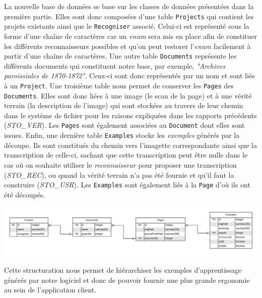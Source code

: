 La nouvelle base de données se base sur les classes de données présentées dans la première partie. Elles sont donc composées d'une table \texttt{Projects} qui contient les projets existants ainsi que le \texttt{Recogniser} associé. Celui-ci est représenté sous la forme d'une chaîne de caractères car un \textit{enum} sera mis en place afin de constituer les différents reconnaisseurs possibles et qu'on peut restorer l'\textit{enum} facilement à partir d'une chaîne de caractères. Une autre table \texttt{Documents} représente les différents documents qui constituent notre base, par exemple, \textit{"Archives paroissiales de 1870-1872"}. Ceux-ci sont donc représentés par un nom et sont liés à un \texttt{Project}. Une troisième table nous permet de conserver les \texttt{Pages} des \texttt{Documents}. Elles sont donc liées à une image (le scan de la page) et à une vérité terrain (la description de l'image) qui sont stockées au travers de leur chemin dans le système de fichier pour les raisons expliquées dans les rapports précédents (\textit{STO\_VER}). Les \texttt{Pages} sont également associées au \texttt{Document} dont elles sont issues. Enfin, une dernière table \texttt{Examples} stocke les \textit{exemples} générés par la découpe. Ils sont constitués du chemin vers l'imagette correspondante ainsi que la transcription de celle-ci, sachant que cette transcription peut être nulle dans le cas où on souhaite utiliser le \textit{reconnaisseur} pour proposer une transcription (\textit{STO\_REC}), ou quand la vérité terrain n'a pas été fournie et qu'il faut la construire (\textit{STO\_USR}). Les \texttt{Examples} sont également liés à la \texttt{Page} d'où ils ont été découpés.

\begin{mdframed}[frametitle={Figure 10 : Structure de la base de données}, innerbottommargin=10]
\begin{center}
\includegraphics[scale=0.53]{assets/DatabaseEntity.pdf}
\end{center}
\end{mdframed}

Cette structuration nous permet de hiérarchiser les exemples d'apprentissage générés par notre logiciel et donc de pouvoir fournir une plus grande ergonomie au sein de l'application client.

